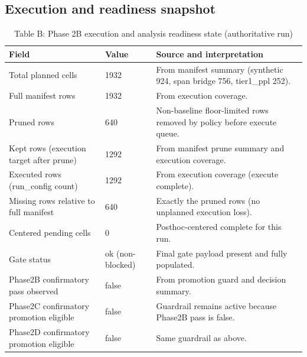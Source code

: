 \documentclass[11pt]{article}
\begin{document}
\subsection*{Execution and readiness snapshot}
\begin{table}[ht]
\centering
\caption{Table B: Phase 2B execution and analysis readiness state (authoritative run)}
\begin{tabularx}{\textwidth}{L{0.45\textwidth}L{0.20\textwidth}Y}
\toprule
\textbf{Field} & \textbf{Value} & \textbf{Source and interpretation} \\
\midrule
Total planned cells & 1932 & From manifest summary (synthetic 924, span bridge 756, tier1\_ppl 252). \\
Full manifest rows & 1932 & From execution coverage. \\
Pruned rows & 640 & Non-baseline floor-limited rows removed by policy before execute queue. \\
Kept rows (execution target after prune) & 1292 & From manifest prune summary and execution coverage. \\
Executed rows (run\_config count) & 1292 & From execution coverage (execute complete). \\
Missing rows relative to full manifest & 640 & Exactly the pruned rows (no unplanned execution loss). \\
Centered pending cells & 0 & Posthoc-centered complete for this run. \\
Gate status & ok (non-blocked) & Final gate payload present and fully populated. \\
Phase2B confirmatory pass observed & false & From promotion guard and decision summary. \\
Phase2C confirmatory promotion eligible & false & Guardrail remains active because Phase2B pass is false. \\
Phase2D confirmatory promotion eligible & false & Same guardrail as above. \\
\bottomrule
\end{tabularx}
\end{table}
\end{document}
